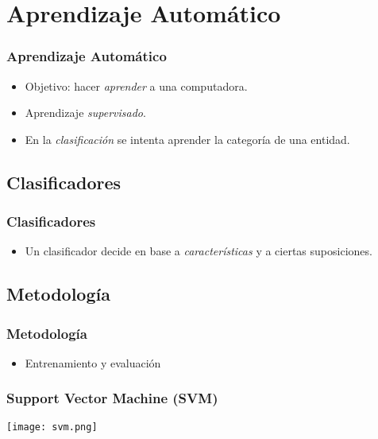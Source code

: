 \section{Aprendizaje Automático}

\begin{frame}
    \frametitle{Aprendizaje Automático}

    \begin{itemize}
        \item Objetivo: hacer \emph{aprender} a una computadora.
        \item Aprendizaje \emph{supervisado}.
        \item En la \emph{clasificación} se intenta aprender la categoría de una entidad.
    \end{itemize}
\end{frame}

\subsection{Clasificadores}
\begin{frame}
    \frametitle{Clasificadores}
    
    \begin{itemize}
        \item Un clasificador decide en base a \emph{características} y a ciertas suposiciones.
    \end{itemize}
\end{frame}

\subsection{Metodología}
\begin{frame}
    \frametitle{Metodología}

    \begin{itemize}
        \item Entrenamiento y evaluación
    \end{itemize}
\end{frame}

\begin{frame}
    \frametitle{Support Vector Machine (SVM)}

    \begin{center}
        \texttt{[image: svm.png]}
    \end{center}
\end{frame}

